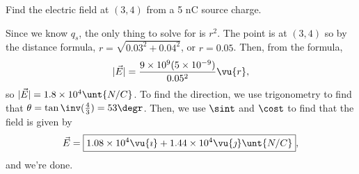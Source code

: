 \documentclass[11pt]{article}
\begin{document}
\begin{example}
	Find the electric field at $(3,4)$ from a 5 nC source charge.	
\end{example}
\begin{solution}
	Since we know $q_s$, the only thing to solve for is $r^2$. The point is at $(3,4)$ so by the distance formula, $r = \sqrt{0.03^2+0.04^2}$, or $r = 0.05$. Then, from the formula,
	\[|\vec{E}| = \frac{9\times10^9(5\times10^{-9})}{0.05^2}\vu{r},\]
	so $|\vec{E}| = 1.8\times 10^{4}\unt{N/C}$. To find the direction, we use trigonometry to find that $\theta = \tan\inv(\frac{4}{3}) = 53\degr$. Then, we use $\sint$ and $\cost$ to find that the field is given by \[\vec{E} = \boxed{1.08\times 10^4\vu{\imath} + 1.44\times 10^{4}\vu{\jmath} \unt{N/C}},\] and we're done.
\end{solution}
\end{document}
